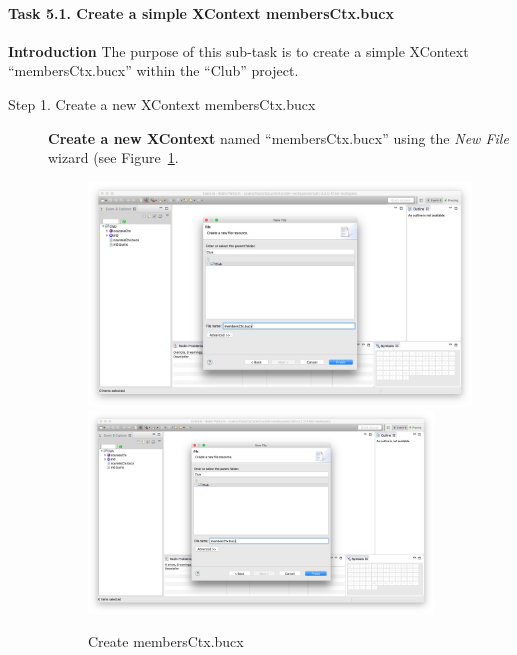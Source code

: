 \paragraph{Task 5.1. Create a simple XContext membersCtx.bucx}
\textbf{Introduction} The purpose of this sub-task is to create a simple XContext ``membersCtx.bucx'' within the ``Club'' project.
\begin{description}
\item[Step 1. Create a new XContext membersCtx.bucx] \textbf{Create a new XContext} named ``membersCtx.bucx'' using the \emph{New File} wizard (see Figure~\ref{fig:CreateMembersCtx}.
  \begin{figure}[!htbp]
    \centering
    \ifplastex
    \includegraphics[width=512]{figures/CreateMembersCtx}
    \else
    \includegraphics[width=0.9\textwidth]{figures/CreateMembersCtx}
    \fi
    \caption{Create membersCtx.bucx}
    \label{fig:CreateMembersCtx}
  \end{figure}


\end{description}
